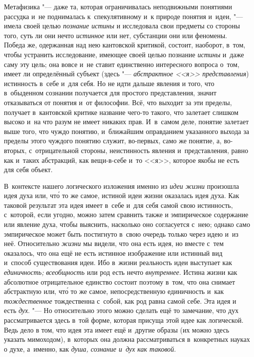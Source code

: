 Метафизика "--- даже та, которая ограничивалась
неподвижными понятиями рассудка и~не поднималась к~спекулятивному и~к
природе понятия и~идеи, "--- имела своей целью {\em познание истины} и
исследовала свои предметы со стороны того, суть ли они нечто
{\em истинное} или нет,
субстанции они или феномены. Победа же, одержанная над нею кантовской
критикой, состоит, наоборот, в~том, чтобы устранить исследование, имеющее
своей целью познание {\em истины}
и~даже саму эту цель; она вовсе и~не ставит единственно
интересного вопроса о~том, имеет ли определённый субъект (здесь
"--- {\em абстрактное <<я>> представления})
истинность в~себе и~для себя. Но не идти дальше явления и
того, что в~обыденном сознании получается для простого представления,
значит отказываться от понятия и~от философии. Всё, что выходит за эти
пределы, получает в~кантовской критике название чего-то такого, что
залетает слишком высоко и~на что разум не имеет никаких прав. И~в~самом
деле, понятие залетает выше того, что чуждо понятию, и~ближайшим
оправданием указанного выхода за пределы этого чуждого понятию служит,
во-первых, само же понятие, а, во-вторых, с~отрицательной
стороны, неистинность явления и~представления, равно как и~таких
абстракций, как вещи-в-себе и~то <<я>>, которое якобы не есть для себя
объект.

В~контексте нашего логического изложения именно из {\em идеи жизни}
произошла идея духа или, чт\'{о} то же самое, истиной идеи жизни
оказалась идея духа. Как таковой результат эта идея имеет в~себе и~для себя
самой свою истинность, с~которой, если угодно, можно затем сравнить также и
эмпирическое содержание или явление духа, чтобы выяснить, насколько оно
согласуется с~нею; однако само эмпирическое может быть постигнуто в~свою
очередь только через идею и~из неё. Относительно {\em жизни} мы видели,
что она есть идея, но вместе с~тем оказалось, что она ещё не есть истинное
изображение или истинный вид и~способ существования идеи. Ибо в~жизни
реальность идеи выступает как {\em единичность;} {\em всеобщность} или род
есть нечто {\em внутреннее}.
Истина жизни как абсолютное отрицательное единство состоит
поэтому в~том, что она снимает абстрактную или, чт\'{о} то же самое,
непосредственную единичность и~как {\em тождественное}
тождественна с~собой, как род равна самой себе. Эта идея и
есть {\em дух}. "--- Но
относительно этого можно сделать ещё то замечание, что дух рассматривается
здесь в~той форме, которая присуща этой идее как логической. Ведь дело в
том, что идея эта имеет ещё и~другие образы (их можно здесь указать
мимоходом), в~которых она должна рассматриваться в~конкретных науках о
духе, а~именно, как {\em душа, сознание и~дух как таковой}.


